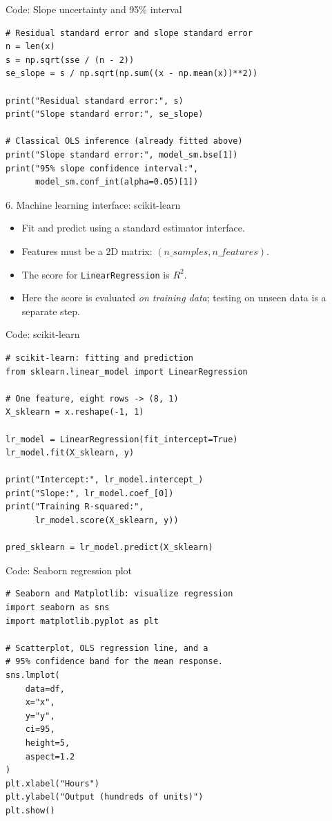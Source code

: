 \documentclass[aspectratio=43,11pt]{beamer}
\begin{document}
\begin{frame}[fragile]{Code: Slope uncertainty and 95\% interval}
\small
\color{maroon}
\begin{verbatim}
# Residual standard error and slope standard error
n = len(x)
s = np.sqrt(sse / (n - 2))
se_slope = s / np.sqrt(np.sum((x - np.mean(x))**2))

print("Residual standard error:", s)
print("Slope standard error:", se_slope)

# Classical OLS inference (already fitted above)
print("Slope standard error:", model_sm.bse[1])
print("95% slope confidence interval:",
      model_sm.conf_int(alpha=0.05)[1])
\end{verbatim}
\end{frame}

\begin{frame}{6. Machine learning interface: scikit-learn}
\begin{itemize}
\item Fit and predict using a standard estimator interface.
\item Features must be a 2D matrix: $(n\_samples, n\_features)$.
\item The score for \texttt{LinearRegression} is $R^2$.
\item Here the score is evaluated \emph{on training data}; testing on unseen data is a separate step.
\end{itemize}
\end{frame}

\begin{frame}[fragile]{Code: scikit-learn}
\small
\color{maroon}
\begin{verbatim}
# scikit-learn: fitting and prediction
from sklearn.linear_model import LinearRegression

# One feature, eight rows -> (8, 1)
X_sklearn = x.reshape(-1, 1)

lr_model = LinearRegression(fit_intercept=True)
lr_model.fit(X_sklearn, y)

print("Intercept:", lr_model.intercept_)
print("Slope:", lr_model.coef_[0])
print("Training R-squared:",
      lr_model.score(X_sklearn, y))

pred_sklearn = lr_model.predict(X_sklearn)
\end{verbatim}
\end{frame}

\begin{frame}[fragile]{Code: Seaborn regression plot}
\small
\color{maroon}
\begin{verbatim}
# Seaborn and Matplotlib: visualize regression
import seaborn as sns
import matplotlib.pyplot as plt

# Scatterplot, OLS regression line, and a
# 95% confidence band for the mean response.
sns.lmplot(
    data=df,
    x="x",
    y="y",
    ci=95,
    height=5,
    aspect=1.2
)
plt.xlabel("Hours")
plt.ylabel("Output (hundreds of units)")
plt.show()
\end{verbatim}
\end{frame}
\end{document}
